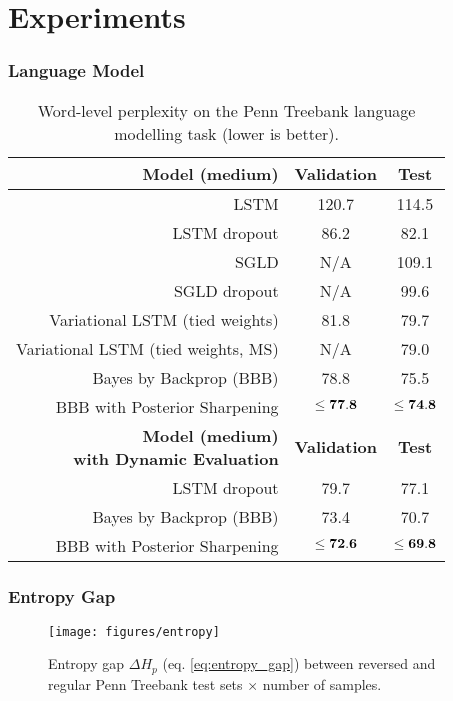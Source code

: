 \section{Experiments}

\begin{frame}
  \frametitle{Language Model}
  \begin{table}
    \caption{Word-level perplexity on the Penn Treebank language modelling task (lower is better).}
    \label{tab:ptb}
    \small
    \begin{tabular}{r|c|c}
      \textbf{Model (medium)}             & \textbf{Validation} & \textbf{Test} \\ 
      \hline
      LSTM & 120.7 & 114.5\\
      LSTM dropout                        & 	86.2	        &	82.1 \\
      SGLD    	                        &	N/A				&	109.1		\\
      SGLD dropout	                    &	N/A				&	99.6		\\
      Variational LSTM (tied weights)     &	81.8        	&	79.7 \\
      Variational LSTM (tied weights, MS)	&	N/A		        &	79.0		\\
      Bayes by Backprop (BBB)       	        & 	78.8	        &	 75.5		\\
      BBB with Posterior Sharpening            &    {$\bf \leq 77.8$}           &   {$\bf \leq 74.8$}		\\
      
      \hline 
      \shortstack{\textbf{Model (medium)} \\ \textbf{with Dynamic Evaluation}}
                                          & \textbf{Validation} & \textbf{Test} \\
      \hline
      LSTM dropout                      & 	79.7	        &	77.1 \\
      Bayes by Backprop (BBB)   	        & 	73.4	        &	70.7		\\
      BBB with Posterior Sharpening	      &    {$\bf \leq 72.6$}          &   {$\bf \leq 69.8$}		\\
      \hline
    \end{tabular}
  \end{table}
\end{frame}


\begin{frame}
  \frametitle{Entropy Gap}
  \begin{figure}[t]
    \centering
    \texttt{[image: figures/entropy]}
    \caption{Entropy gap $\Delta H_p$ (eq. \eqref{eq:entropy_gap}) between reversed and regular Penn Treebank test sets $\times$ number of samples.}
    \label{fig:uncertainty}
    \vskip -0.2in
  \end{figure}
\end{frame}


